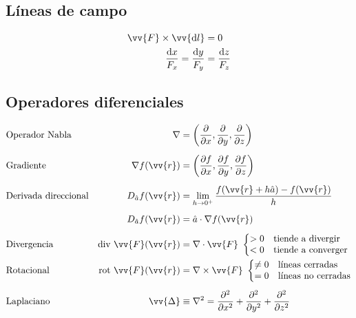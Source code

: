 \documentclass[a4paper, 8pt]{extarticle}
\renewcommand{\vec}[1]{\vv{{#1}}}
\renewcommand{\grad}{\nabla}
\begin{document}
\begin{multicols}{3}
  \subsection{Líneas de campo}
  \begin{align*}
    \vec{F} \times \vec{\dd l}            & = 0                 \\
    \frac{\dd x}{F_x} = \frac{\dd y}{F_y} & = \frac{\dd z}{F_z} \\
  \end{align*}

  \subsection{Operadores diferenciales}
  \begin{align*}
     & \text{Operador Nabla}       & \grad                       & = \left( \pdv{}{x}, \pdv{}{y}, \pdv{}{z} \right)              \\[5pt]
     & \text{Gradiente}            & \grad f(\vec{r})            & = \left( \pdv{f}{x}, \pdv{f}{y}, \pdv{f}{z} \right)           \\[5pt]
     & \text{Derivada direccional} & D_{\hat{a}}f(\vec{r})       & = \lim_{h\to0^+} \frac{f(\vec{r} + h\hat{a}) - f(\vec{r})}{h} \\[5pt]
     &                             & D_{\hat{a}}f(\vec{r})       & = \hat{a} \cdot \grad f(\vec{r})                              \\[5pt]
     & \text{Divergencia}          & \text{div }\vec{F}(\vec{r}) & = \grad \cdot \vec{F} \ \left\lbrace
    \begin{matrix*}[l]
      > 0 &\text{tiende a divergir}\\
      < 0 &\text{tiende a converger}\\
    \end{matrix*} \right.                                                                                                \\
     & \text{Rotacional}           & \text{rot }\vec{F}(\vec{r}) & = \grad \times \vec{F} \ \left\lbrace
    \begin{matrix*}[l]
      \not = 0 &\text{líneas cerradas}\\
      = 0 &\text{líneas no cerradas}\\
    \end{matrix*} \right.                                                                                              \\[5pt]
     & \text{Laplaciano}           & \vec{\Delta}                & \equiv \grad ^2 = \pdv[2]{}{x} + \pdv[2]{}{y} + \pdv[2]{}{z}
  \end{align*}


\end{multicols}
\end{document}
